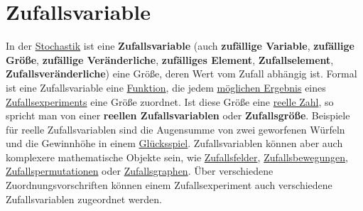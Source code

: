 \documentclass[../Main.tex]{subfiles}
\begin{document}
\section{Zufallsvariable}
In der \href{https://de.wikipedia.org/wiki/Stochastik}{Stochastik} ist eine \textbf{Zufallsvariable} (auch \textbf{zufällige Variable}, \textbf{zufällige Größe}, \textbf{zufällige Veränderliche}, \textbf{zufälliges Element}, \textbf{Zufallselement}, \textbf{Zufallsveränderliche}) eine Größe, deren Wert vom Zufall abhängig ist. Formal ist eine Zufallsvariable eine \href{https://de.wikipedia.org/wiki/Funktion_(Mathematik)}{Funktion}, die jedem \href{https://de.wikipedia.org/wiki/Ergebnis_(Stochastik)}{möglichen Ergebnis} eines \href{https://de.wikipedia.org/wiki/Zufallsexperiment}{Zufallsexperiments} eine Größe zuordnet. Ist diese Größe eine \href{https://de.wikipedia.org/wiki/Reelle_Zahl}{reelle Zahl}, so spricht man von einer \textbf{reellen Zufallsvariablen} oder \textbf{Zufallsgröße}. Beispiele für reelle Zufallsvariablen sind die Augensumme von zwei geworfenen Würfeln und die Gewinnhöhe in einem \href{https://de.wikipedia.org/wiki/Gl\%C3\%BCcksspiel}{Glücksspiel}. Zufallsvariablen können aber auch komplexere mathematische Objekte sein, wie \href{https://de.wikipedia.org/wiki/Zufallsfeld}{Zufallsfelder}, \href{https://de.wikipedia.org/wiki/Zufallsbewegung}{Zufallsbewegungen}, \href{https://de.wikipedia.org/wiki/Zufallspermutation}{Zufallspermutationen} oder \href{https://de.wikipedia.org/wiki/Zufallsgraph}{Zufallsgraphen}. Über verschiedene Zuordnungsvorschriften können einem Zufallsexperiment auch verschiedene Zufallsvariablen zugeordnet werden.
\newpage
\end{document}
